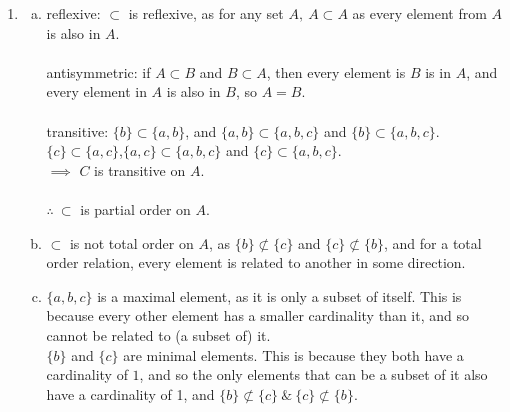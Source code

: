 \documentclass{article}
\begin{document}
\begin{enumerate}
\begin{enumerate}[(i)]
                symmetric: if $x$ is even, $xy$ is even.\\
                $y + (\text{even})$ is only even if $y$ is even.\\
                $\therefore$ if $y$ is odd, the relation is not symmetric. $\implies$ not symmetric $\forall x,y\in\mathbb{Z}$.\\\\
                transitive: $2+2(3)=8$, which is even, and $3+3(5)=18$, which is even. $2+2(5)=12$, which is even. $\implies$ transitive.\\\\
                $\therefore$ reflexive and transitive.
        \end{enumerate}
  \item
        \begin{enumerate}[(a)]
          \item
                reflexive: $\subset$ is reflexive, as for any set $A,\ A\subset A$ as every element from $A$ is also in $A$.\\\\
                antisymmetric: if $A\subset B$ and $B\subset A$, then every element is $B$ is in $A$, and every element in $A$ is also in $B$, so $A=B$.\\\\
                transitive: $\{b\}\subset\{a,b\}$, and $\{a,b\}\subset \{a,b,c\}$ and $\{b\}\subset\{a,b,c\}$.\\$\{c\}\subset\{a,c\}$,$\{a,c\}\subset\{a,b,c\}$ and $\{c\}\subset\{a,b,c\}.$\\$\implies$ $C$ is transitive on $A$.\\\\
                $\therefore\ \subset$ is partial order on $A$.
          \item
                $\subset$ is not total order on $A$, as $\{b\}\not\subset\{c\}$ and $\{c\}\not\subset\{b\}$, and for a total order relation, every element is related to another in some direction.
          \item
                $\{a,b,c\}$ is a maximal element, as it is only a subset of itself. This is because every other element has a smaller cardinality than it, and so cannot be related to (a subset of) it.\\
                $\{b\}$ and $\{c\}$ are minimal elements. This is because they both have a cardinality of $1$, and so the only elements that can be a subset of it also have a cardinality of 1, and $\{b\}\not\subset\{c\}\ \&\ \{c\}\not\subset\{b\}$.
        \end{enumerate}
\end{enumerate}
\end{document}
